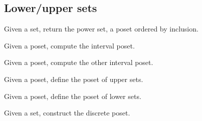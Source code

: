\subsection{Lower/upper sets}
\begin{codeexercise}
    Given a set, return the power set, a poset ordered by inclusion.

\end{codeexercise}

\begin{codeexercise}
    Given a poset, compute the interval poset.

\end{codeexercise}

\begin{codeexercise}
    Given a poset, compute the other interval poset.

\end{codeexercise}

\begin{codeexercise}
    Given a poset, define the poset of upper sets.

\end{codeexercise}

\begin{codeexercise}
    Given a poset, define the poset of lower sets.
\end{codeexercise}

\begin{codeexercise}
    Given a set, construct the discrete poset.

\end{codeexercise}
%
%
